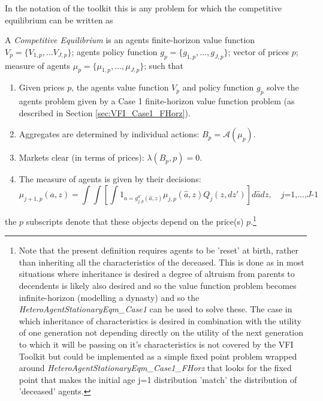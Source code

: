 In the notation of the toolkit this is any problem for which the competitive equilibrium can be written as
\begin{definition} \label{defn:OLG_CE}
A \textit{Competitive Equilibrium} is an agents finite-horizon value function $V_{p}=\{V_{1,p},...V_{J,p}\}$; agents policy function $g_p=\{g_{1,p},...,g_{J,p}\}$;
vector of prices $p$; measure of agents $\mu_{p}=\{\mu_{1,p},...,\mu_{J,p}\}$; such that
\begin{enumerate}
 \item Given prices $p$, the agents value function $V_p$ and policy function $g_p$ solve the agents problem
   given by a Case 1 finite-horizon value function problem (as described in Section \ref{sec:VFI_Case1_FHorz}).
 \item Aggregates are determined by individual actions: $B_p=\mathcal{A}(\mu_p)$.
 \item Markets clear (in terms of prices): $\lambda(B_p,p)=0$.
 \item The measure of agents is given by their decisions:
      \begin{equation}
          \mu_{j+1,p}(a,z)=\int \int \left[ \int 1_{a=g^{a'}_{j,p}(\hat{a},z)}\mu_{j,p}(\hat{a},z) Q_j(z,dz')\right] d\hat{a}dz, \quad \textit{j=1,...,J-1}
      \end{equation}
\end{enumerate}
\end{definition}
the $p$ subscripts denote that these objects depend on the price(s) $p$.\footnote{Note that the present definition requires agents to be 'reset' at birth, rather than inheriting
all the characteristics of the deceased. This is done as in most situations where inheritance is desired a degree of altruism from parents to decendents is likely also desired
and so the value function problem becomes infinite-horizon (modelling a dynasty) and so the \textit{HeteroAgentStationaryEqm\_{}Case1} can be used to solve these. The case
in which inheritance of characteristics is desired in combination with the utility of one generation not depending directly on the utility of the next generation to which
it will be passing on it's characteristics is not covered by the VFI Toolkit but could be implemented as a simple fixed point problem wrapped around
\textit{HeteroAgentStationaryEqm\_{}Case1\_{}FHorz} that looks for the fixed point that makes the initial age j=1 distribution 'match' the distribution of 'deceased' agents.}

